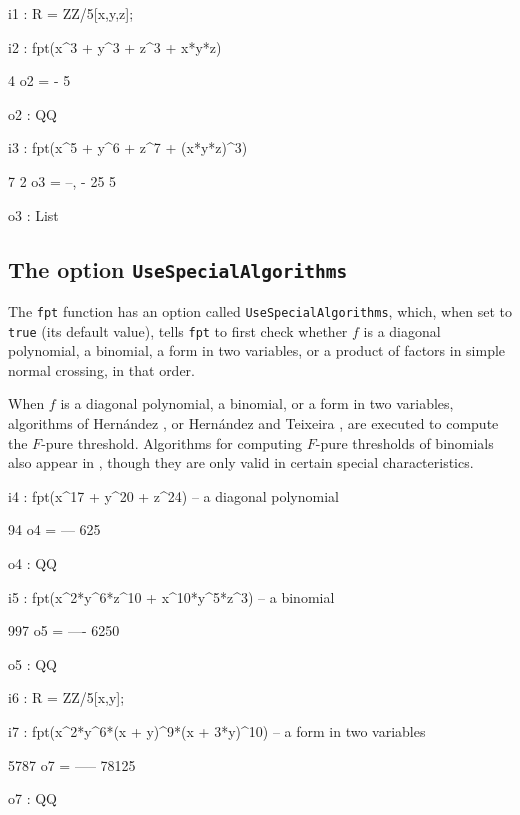 \documentclass{amsart}
\begin{document}
\bigskip
{\small
{}
\begin{MyVerbatim}
i1 : R = ZZ/5[x,y,z];

i2 : fpt(x^3 + y^3 + z^3 + x*y*z)

     4
o2 = -
     5

o2 : QQ

i3 : fpt(x^5 + y^6 + z^7 + (x*y*z)^3)

       7  2
o3 = {--, -}
      25  5

o3 : List
\end{MyVerbatim}
}
\bigskip

\subsection{The option \texttt{UseSpecialAlgorithms}}

The \texttt{fpt} function has an option called \texttt{UseSpecialAlgorithms}, which, when set to \texttt{true} (its default value), tells \texttt{fpt} to first check whether $f$ is a diagonal polynomial, a binomial, a form in two variables, or a product of factors in simple normal crossing, in that order.


When $f$ is a diagonal polynomial, a binomial, or a form in two variables, algorithms of Hern\'andez \cite{HernandezFInvariantsOfDiagonalHyp, HernandezFPureThresholdOfBinomial}, or Hern\'andez and Teixeira \cite{HernandezTeixeiraFThresholdFunctions},  are executed to compute the $F$-pure threshold.
Algorithms for computing $F$-pure thresholds of binomials also appear in \cite{ShibutaTakagiLCThresholds}, though they are only valid in certain special characteristics.

\bigskip
{\small
{}
\begin{MyVerbatim}
i4 : fpt(x^17 + y^20 + z^24) -- a diagonal polynomial

      94
o4 = ---
     625

o4 : QQ

i5 : fpt(x^2*y^6*z^10 + x^10*y^5*z^3) -- a binomial

      997
o5 = ----
     6250

o5 : QQ

i6 : R = ZZ/5[x,y];

i7 : fpt(x^2*y^6*(x + y)^9*(x + 3*y)^10) -- a form in two variables

      5787
o7 = -----
     78125

o7 : QQ
\end{MyVerbatim}
}
\bigskip
\end{document}

